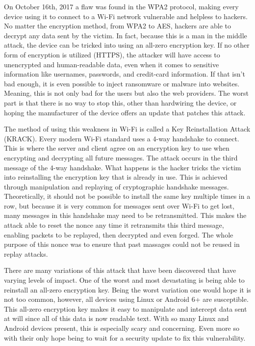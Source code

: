 \documentclass[11pt,]{article}
\begin{document}
On October 16th, 2017 a flaw was found in the WPA2 protocol, making
every device using it to connect to a Wi-Fi network vulnerable and
helpless to hackers. No matter the encryption method, from WPA2 to AES,
hackers are able to decrypt any data sent by the victim. In fact,
because this is a man in the middle attack, the device can be tricked
into using an all-zero encryption key. If no other form of encryption is
utilized (HTTPS), the attacker will have access to unencrypted and
human-readable data, even when it comes to sensitive information like
usernames, passwords, and credit-card information. If that isn't bad
enough, it is even possible to inject ransomware or malware into
websites. Meaning, this is not only bad for the users but also the web
providers. The worst part is that there is no way to stop this, other
than hardwiring the device, or hoping the manufacturer of the device
offers an update that patches this attack. \citet{KrackAttacks}

The method of using this weakness in Wi-Fi is called a Key
Reinstallation Attack (KRACK). Every modern Wi-Fi standard uses a 4-way
handshake to connect. This is where the server and client agree on an
encryption key to use when encrypting and decrypting all future
messages. The attack occurs in the third message of the 4-way handshake.
What happens is the hacker tricks the victim into reinstalling the
encryption key that is already in use. This is achieved through
manipulation and replaying of cryptographic handshake messages.
Theoretically, it should not be possible to install the same key
multiple times in a row, but because it is very common for messages sent
over Wi-Fi to get lost, many messages in this handshake may need to be
retransmitted. This makes the attack able to reset the nonce any time it
retransmits this third message, enabling packets to be replayed, then
decrypted and even forged. The whole purpose of this nonce was to ensure
that past massages could not be reused in replay attacks.

There are many variations of this attack that have been discovered that
have varying levels of impact. One of the worst and most devastating is
being able to reinstall an all-zero encryption key. Being the worst
variation one would hope it is not too common, however, all devices
using Linux or Android 6+ are susceptible. This all-zero encryption key
makes it easy to manipulate and intercept data sent at will since all of
this data is now readable text. With so many Linux and Android devices
present, this is especially scary and concerning. Even more so with
their only hope being to wait for a security update to fix this
vulnerability.
\end{document}
